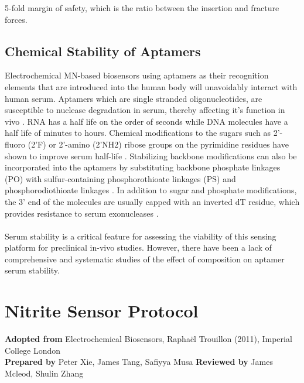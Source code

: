 \begin{appendices}
5-fold margin of safety, which  is the ratio between the insertion and fracture forces. 

\subsection{Chemical Stability of Aptamers}
Electrochemical MN-based biosensors using aptamers as their recognition elements that are introduced into the human body will unavoidably interact with human serum. Aptamers which are single stranded oligonucleotides, are susceptible to nuclease degradation in serum, thereby affecting it's function in vivo \cite{kratschmer2017effect}. RNA has a half life on the order of seconds while DNA molecules have a half life of minutes to hours\cite{morrissey2005activity,kurreck2002design}. Chemical modifications to the sugars such as 2’-fluoro (2’F) or 2’-amino (2’NH2) ribose groups on the pyrimidine residues have shown to improve serum half-life \cite{barciszewski2009locked}. Stabilizing backbone modifications can
also be incorporated into the aptamers by substituting backbone phosphate linkages (PO) with sulfur-containing phosphorothioate linkages (PS) \cite{green1995nuclease} and phosphorodiothioate linkages \cite{yang2004progress}. In addition to sugar and phosphate modifications, the 3’ end of the molecules are usually capped with an inverted dT residue, which provides resistance to serum exonucleases \cite{dass2002cellular}.\\\\
 Serum stability is a critical feature for assessing the viability of this sensing platform for preclinical in-vivo studies. However, there have been a lack of comprehensive and systematic studies of the effect of composition  on aptamer serum stability.

\newpage
\section{Nitrite Sensor Protocol} \label{app:nitrite_protocol}
\textbf{Adopted from} Electrochemical Biosensors, Raphaël Trouillon (2011), Imperial College London\\ \textbf{Prepared by} Peter Xie, James Tang, Safiyya Musa \quad  \textbf{Reviewed by} James Mcleod, Shulin Zhang

\end{appendices}
